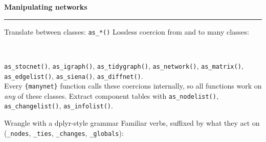 \documentclass[9pt]{extarticle}
\let\code\verb
\newcommand{\colhead}[2]{%
  {\color{mnink}\bfseries\large #1\; #2}\\[-4pt]
  {\color{mngold}\rule{\linewidth}{1.2pt}}\vspace{1pt}}
\begin{document}
\begin{minipage}[t]{0.323\textwidth}
\colhead{\faRandom}{Manipulating networks}

\begin{mnbox}{Translate between classes: \texttt{as\_*()}}
Lossless coercion from and to many classes:
\begin{center}
\\[-2pt]
\end{center}
\code|as_stocnet()|, \code|as_igraph()|, \code|as_tidygraph()|, \code|as_network()|,
\code|as_matrix()|, \code|as_edgelist()|, \code|as_siena()|, \code|as_diffnet()|.\\[2pt]
Every \code|{manynet}| function calls these coercions internally, so all
functions work on \emph{any} of these classes. Extract component tables with
\code|as_nodelist()|, \code|as_changelist()|, \code|as_infolist()|.
\end{mnbox}

\begin{mnbox}{Wrangle with a dplyr-style grammar}
Familiar verbs, suffixed by what they act on
(\code|_nodes|, \code|_ties|, \code|_changes|, \code|_globals|):


\end{mnbox}
\end{minipage}
\end{document}
